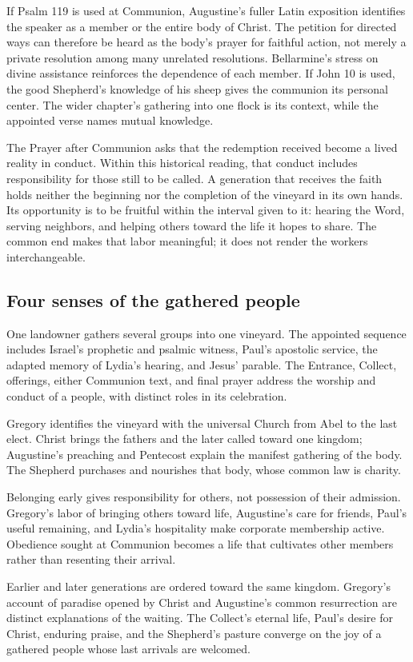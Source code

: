 If Psalm 119 is used at Communion, Augustine's fuller Latin exposition identifies the speaker as a member or the entire body of Christ. The petition for directed ways can therefore be heard as the body's prayer for faithful action, not merely a private resolution among many unrelated resolutions. Bellarmine's stress on divine assistance reinforces the dependence of each member. If John 10 is used, the good Shepherd's knowledge of his sheep gives the communion its personal center. The wider chapter's gathering into one flock is its context, while the appointed verse names mutual knowledge.

The Prayer after Communion asks that the redemption received become a lived reality in conduct. Within this historical reading, that conduct includes responsibility for those still to be called. A generation that receives the faith holds neither the beginning nor the completion of the vineyard in its own hands. Its opportunity is to be fruitful within the interval given to it: hearing the Word, serving neighbors, and helping others toward the life it hopes to share. The common end makes that labor meaningful; it does not render the workers interchangeable.

\subsection{Four senses of the gathered people}
\begin{fourSenses}
\item[Literal.] One landowner gathers several groups into one vineyard. The appointed sequence includes Israel's prophetic and psalmic witness, Paul's apostolic service, the adapted memory of Lydia's hearing, and Jesus' parable. The Entrance, Collect, offerings, either Communion text, and final prayer address the worship and conduct of a people, with distinct roles in its celebration.

\item[Allegorical.] Gregory identifies the vineyard with the universal Church from Abel to the last elect. Christ brings the fathers and the later called toward one kingdom; Augustine's preaching and Pentecost explain the manifest gathering of the body. The Shepherd purchases and nourishes that body, whose common law is charity.

\item[Moral.] Belonging early gives responsibility for others, not possession of their admission. Gregory's labor of bringing others toward life, Augustine's care for friends, Paul's useful remaining, and Lydia's hospitality make corporate membership active. Obedience sought at Communion becomes a life that cultivates other members rather than resenting their arrival.

\item[Anagogical.] Earlier and later generations are ordered toward the same kingdom. Gregory's account of paradise opened by Christ and Augustine's common resurrection are distinct explanations of the waiting. The Collect's eternal life, Paul's desire for Christ, enduring praise, and the Shepherd's pasture converge on the joy of a gathered people whose last arrivals are welcomed.
\end{fourSenses}
